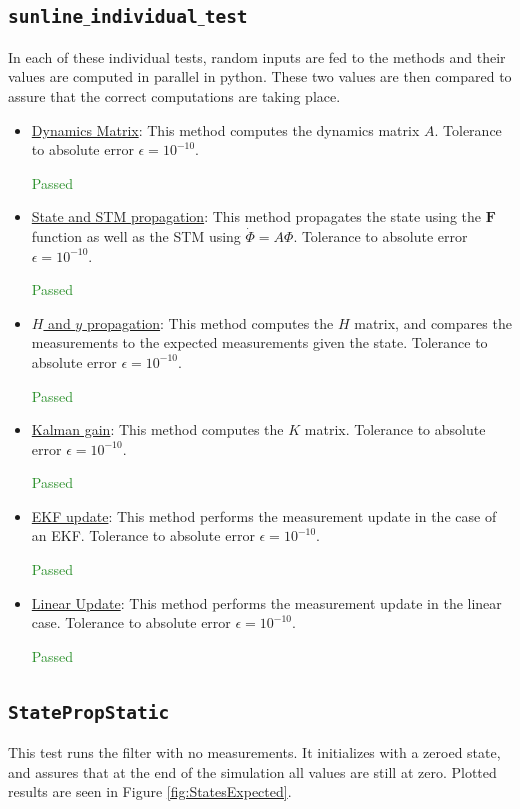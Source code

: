 \documentclass[]{BasiliskReportMemo}
\begin{document}
\subsection{\texttt{sunline$\_$individual$\_$test}}

In each of these individual tests, random inputs are fed to the methods and their values are computed in parallel in python. These two values are then compared to assure that the correct computations are taking place. 
\begin{itemize}
\item \underline{Dynamics Matrix}: This method computes the dynamics matrix $A$. Tolerance to absolute error $\epsilon = 10^{-10}$.

\textcolor{ForestGreen}{Passed}
\item \underline{State and STM propagation}: This method propagates the state using the $\bm F$ function as well as the STM using $\dot{\Phi} = A \Phi$. Tolerance to absolute error $\epsilon = 10^{-10}$.

\textcolor{ForestGreen}{Passed}
\item \underline{$H$ and $y$ propagation}: This method computes the $H$ matrix, and compares the measurements to the expected measurements given the state. Tolerance to absolute error $\epsilon = 10^{-10}$.

\textcolor{ForestGreen}{Passed}
\item \underline{Kalman gain}: This method computes the $K$ matrix. Tolerance to absolute error $\epsilon = 10^{-10}$.

\textcolor{ForestGreen}{Passed}
\item \underline{EKF update}: This method performs the measurement update in the case of an EKF. Tolerance to absolute error $\epsilon = 10^{-10}$.

\textcolor{ForestGreen}{Passed}
\item \underline{Linear Update}: This method performs the measurement update in the linear case. Tolerance to absolute error $\epsilon = 10^{-10}$.

\textcolor{ForestGreen}{Passed}
\end{itemize}

\subsection{\texttt{StatePropStatic}}

This test runs the filter with no measurements. It initializes with a zeroed state, and assures that at the end of the simulation all values are still at zero. Plotted results are seen in Figure \ref{fig:StatesExpected}.
\end{document}
